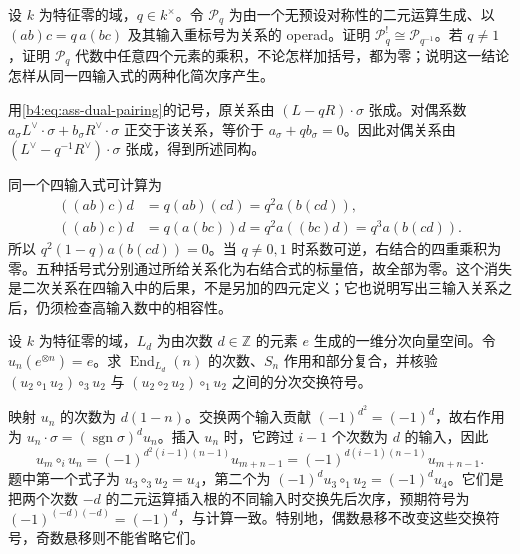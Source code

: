 \begin{exercise}\label{b4:ex:G-scaled-associativity-dual}
	设 \(k\) 为特征零的域，\(q\in k^\times\)。令 \(\mathcal P_q\) 为由一个无预设对称性的二元运算生成、以 \((ab)c=q\,a(bc)\) 及其输入重标号为关系的 operad。证明 \(\mathcal P_q^!\cong\mathcal P_{q^{-1}}\)。若 \(q\ne1\)，证明 \(\mathcal P_q\) 代数中任意四个元素的乘积，不论怎样加括号，都为零；说明这一结论怎样从同一四输入式的两种化简次序产生。
\end{exercise}
\begin{solution}
	用\eqref{b4:eq:ass-dual-pairing}的记号，原关系由 \((L-qR)\cdot\sigma\) 张成。对偶系数 \(a_\sigma L^\vee\cdot\sigma+b_\sigma R^\vee\cdot\sigma\) 正交于该关系，等价于 \(a_\sigma+q b_\sigma=0\)。因此对偶关系由 \((L^\vee-q^{-1}R^\vee)\cdot\sigma\) 张成，得到所述同构。

	同一个四输入式可计算为
	\[
		\begin{aligned}
			((ab)c)d&=q(ab)(cd)=q^2a(b(cd)),\\
			((ab)c)d&=q(a(bc))d=q^2a((bc)d)=q^3a(b(cd)).
		\end{aligned}
	\]
	所以 \(q^2(1-q)a(b(cd))=0\)。当 \(q\ne0,1\) 时系数可逆，右结合的四重乘积为零。五种括号式分别通过所给关系化为右结合式的标量倍，故全部为零。这个消失是二次关系在四输入中的后果，不是另加的四元定义；它也说明写出三输入关系之后，仍须检查高输入数中的相容性。
\end{solution}

\begin{exercise}\label{b4:ex:G-general-shift-operad}
	设 \(k\) 为特征零的域，\(L_d\) 为由次数 \(d\in\mathbb Z\) 的元素 \(e\) 生成的一维分次向量空间。令 \(u_n(e^{\otimes n})=e\)。求 \(\operatorname{End}_{L_d}(n)\) 的次数、\(S_n\) 作用和部分复合，并核验 \((u_2\circ_1u_2)\circ_3u_2\) 与 \((u_2\circ_2u_2)\circ_1u_2\) 之间的分次交换符号。
\end{exercise}
\begin{solution}
	映射 \(u_n\) 的次数为 \(d(1-n)\)。交换两个输入贡献 \((-1)^{d^2}=(-1)^d\)，故右作用为 \(u_n\cdot\sigma=(\operatorname{sgn}\sigma)^d u_n\)。插入 \(u_n\) 时，它跨过 \(i-1\) 个次数为 \(d\) 的输入，因此
	\[
		u_m\circ_i u_n=(-1)^{d^2(i-1)(n-1)}u_{m+n-1}
		=(-1)^{d(i-1)(n-1)}u_{m+n-1}.
	\]
	题中第一个式子为 \(u_3\circ_3u_2=u_4\)，第二个为 \((-1)^d u_3\circ_1u_2=(-1)^d u_4\)。它们是把两个次数 \(-d\) 的二元运算插入根的不同输入时交换先后次序，预期符号为 \((-1)^{(-d)(-d)}=(-1)^d\)，与计算一致。特别地，偶数悬移不改变这些交换符号，奇数悬移则不能省略它们。
\end{solution}

